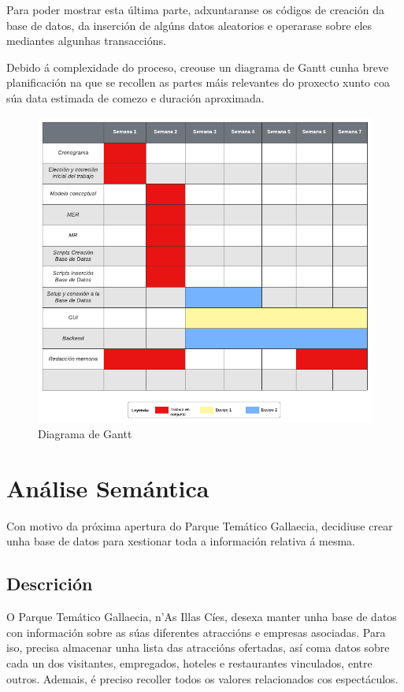 \documentclass[12pt,a4paper]{book}
\theoremstyle{definition}
\theoremstyle{break}
\begin{document}
	Para poder mostrar esta última parte, adxuntaranse os códigos de creación da base de datos, da inserción de algúns datos aleatorios e operarase sobre eles mediantes algunhas transaccións. 
	
	Debido á complexidade do proceso, creouse un diagrama de Gantt cunha breve planificación na que se recollen as partes máis relevantes do proxecto xunto coa súa data estimada de comezo e duración aproximada. 
	
	\begin{figure} [H] \centering
		\caption{Diagrama de Gantt}
		\includegraphics[width=\textwidth]{Diagrama de Gantt.pdf}
	\end{figure}
	
	
	\chapter{Análise Semántica}
	Con motivo da próxima apertura do Parque Temático {\logo Gallaecia}, decidiuse crear unha base de datos para xestionar toda a información relativa á mesma.
	
	\section{Descrición}
	O Parque Temático {\logo Gallaecia}, n'As Illas Cíes, desexa manter unha base de datos con información sobre as súas diferentes atraccións e empresas asociadas. Para iso, precisa almacenar unha lista das atraccións ofertadas, así coma datos sobre cada un dos visitantes, empregados, hoteles e restaurantes vinculados, entre outros. Ademais, é preciso recoller todos os valores relacionados cos espectáculos.
	
\end{document}
